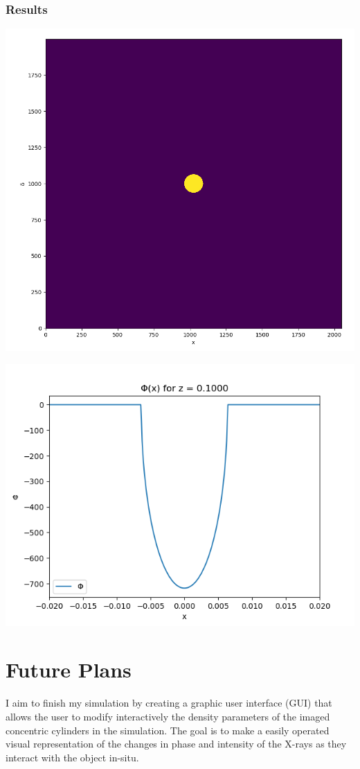 \documentclass[9pt, a4paper]{article}
\newenvironment{Figure}
    {\par\medskip\noindent\minipage{\linewidth}}
    {\endminipage\par\medskip}
\begin{document}
\subsubsection{Results}
\begin{Figure}
\centering
\includegraphics[width=0.6\linewidth]{cross_section.png}
\end{Figure}
\begin{Figure}
\centering
\includegraphics[width=0.6\linewidth]{20000.png}
\end{Figure}

\section{Future Plans}
I aim to finish my simulation by creating a graphic user interface (GUI) that allows the user to modify interactively the density parameters of the imaged concentric cylinders in the simulation. The goal is to make a easily operated visual representation of the changes in phase and intensity of the X-rays as they interact with the object in-situ.
\end{document}
